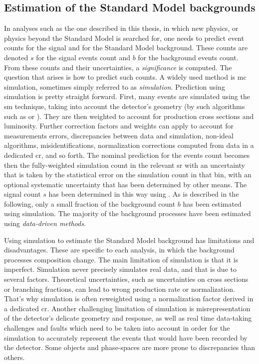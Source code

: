 \clearpage
\subsection{Estimation of the Standard Model backgrounds}
\label{sec:background-estimation}

In analyses such as the one described in this thesis, in which new physics, or physics beyond the Standard Model is searched for, one needs to predict event counts for the signal and for the Standard Model background. These counts are denoted $s$ for the signal events count and $b$ for the background events count. From these counts and their uncertainties, a \emph{significance} is computed. The question that arises is how to predict such counts. A widely used method is \gls{mc} simulation, sometimes simply referred to as \emph{simulation}. Prediction using simulation is pretty straight forward. First, many events are simulated using the \gls{sm} technique, taking into account the detector's geometry (by such algorithms such as \FASTSIM or \FULLSIM). They are then weighted to account for production cross sections and luminosity. Further correction factors and weights can apply to account for measurements errors, discrepancies between data and simulation, non-ideal algorithms, misidentifications, normalization corrections computed from data in a dedicated \gls{cr}, and so forth. The nominal prediction for the events count becomes then the fully-weighted simulation count in the relevant \gls{sr} with an uncertainty that is taken by the statistical error on the simulation count in that bin, with an optional systematic uncertainty that has been determined by other means. The signal count $s$ has been determined in this way using \FASTSIM. As is described in the following, only a small fraction of the background count $b$ has been estimated using simulation. The majority of the background processes have been estimated using \emph{data-driven methods}.

Using simulation to estimate the Standard Model background has limitations and disadvantages. These are specific to each analysis, in which the background processes composition change. The main limitation of simulation is that it is imperfect. Simulation never precisely simulates real data, and that is due to several factors. Theoretical uncertainties, such as uncertainties on cross sections or branching fractions, can lead to wrong production rate or normalization. That's why simulation is often reweighted using a normalization factor derived in a dedicated \gls{cr}. Another challenging limitation of simulation is misrepresentation of the detector's delicate geometry and response, as well as real time data-taking challenges and faults which need to be taken into account in order for the simulation to accurately represent the events that would have been recorded by the detector. Some objects and phase-spaces are more prone to discrepancies than others.

